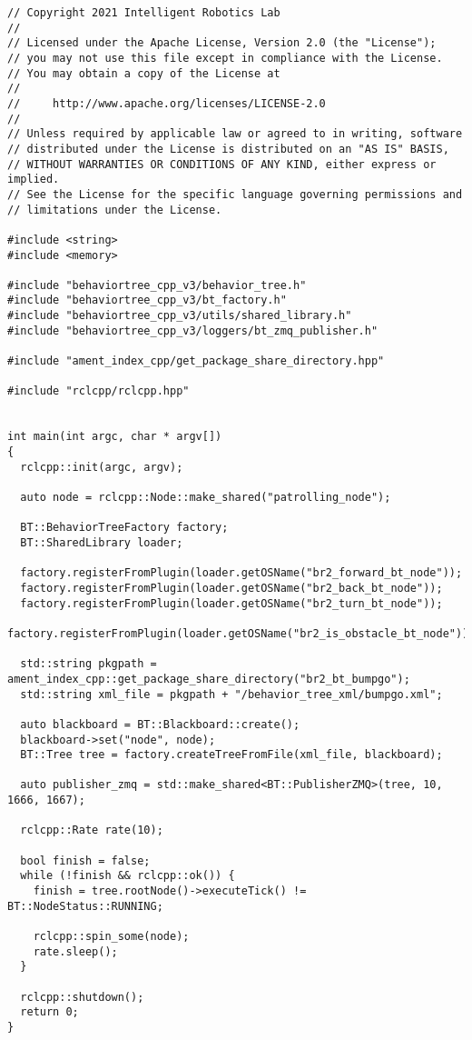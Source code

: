  \footnotesize
\begin{tcolorbox}[sharp corners, colframe=gray!80, colback=LightGray, left=0pt, top=0pt, bottom=0pt, title=\texttt{br2\_bt\_bumpgo/src/bt\_bumpgo\_main.cpp}]
  \begin{verbatim}
// Copyright 2021 Intelligent Robotics Lab
//
// Licensed under the Apache License, Version 2.0 (the "License");
// you may not use this file except in compliance with the License.
// You may obtain a copy of the License at
//
//     http://www.apache.org/licenses/LICENSE-2.0
//
// Unless required by applicable law or agreed to in writing, software
// distributed under the License is distributed on an "AS IS" BASIS,
// WITHOUT WARRANTIES OR CONDITIONS OF ANY KIND, either express or implied.
// See the License for the specific language governing permissions and
// limitations under the License.

#include <string>
#include <memory>

#include "behaviortree_cpp_v3/behavior_tree.h"
#include "behaviortree_cpp_v3/bt_factory.h"
#include "behaviortree_cpp_v3/utils/shared_library.h"
#include "behaviortree_cpp_v3/loggers/bt_zmq_publisher.h"

#include "ament_index_cpp/get_package_share_directory.hpp"

#include "rclcpp/rclcpp.hpp"


int main(int argc, char * argv[])
{
  rclcpp::init(argc, argv);

  auto node = rclcpp::Node::make_shared("patrolling_node");

  BT::BehaviorTreeFactory factory;
  BT::SharedLibrary loader;

  factory.registerFromPlugin(loader.getOSName("br2_forward_bt_node"));
  factory.registerFromPlugin(loader.getOSName("br2_back_bt_node"));
  factory.registerFromPlugin(loader.getOSName("br2_turn_bt_node"));
  factory.registerFromPlugin(loader.getOSName("br2_is_obstacle_bt_node"));

  std::string pkgpath = ament_index_cpp::get_package_share_directory("br2_bt_bumpgo");
  std::string xml_file = pkgpath + "/behavior_tree_xml/bumpgo.xml";

  auto blackboard = BT::Blackboard::create();
  blackboard->set("node", node);
  BT::Tree tree = factory.createTreeFromFile(xml_file, blackboard);

  auto publisher_zmq = std::make_shared<BT::PublisherZMQ>(tree, 10, 1666, 1667);

  rclcpp::Rate rate(10);

  bool finish = false;
  while (!finish && rclcpp::ok()) {
    finish = tree.rootNode()->executeTick() != BT::NodeStatus::RUNNING;

    rclcpp::spin_some(node);
    rate.sleep();
  }

  rclcpp::shutdown();
  return 0;
}
    \end{verbatim}
    \end{tcolorbox}
  \normalsize

